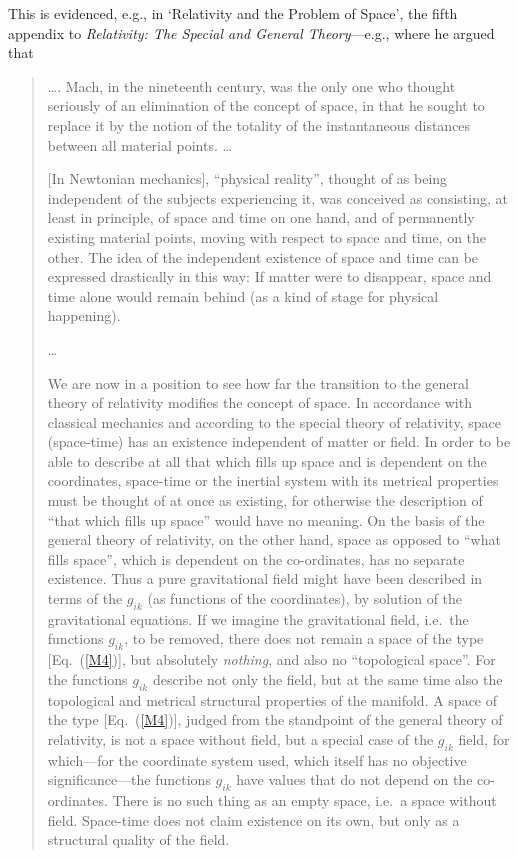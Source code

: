 This is evidenced, e.g., in `Relativity and the Problem of Space', the fifth appendix to \textit{Relativity: The Special and General Theory}---e.g., where he argued that \cite{Einstein2001}
\begin{quotation}
\ldots. Mach, in the nineteenth century, was the only one who thought seriously of an elimination of the concept of space, in that he sought to replace it by the notion of the totality of the instantaneous distances between all material points. \ldots

[In Newtonian mechanics], ``physical reality'', thought of as being independent of the subjects experiencing it, was conceived as consisting, at least in principle, of space and time on one hand, and of permanently existing material points, moving with respect to space and time, on the other. The idea of the independent existence of space and time can be expressed drastically in this way: If matter were to disappear, space and time alone would remain behind (as a kind of stage for physical happening).

\ldots 

We are now in a position to see how far the transition to the general theory of relativity modifies the concept of space. In accordance with classical mechanics and according to the special theory of relativity, space (space-time) has an existence independent of matter or field. In order to be able to describe at all that which fills up space and is dependent on the coordinates, space-time or the inertial system with its metrical properties must be thought of at once as existing, for otherwise the description of ``that which fills up space'' would have no meaning. On the basis of the general theory of relativity, on the other hand, space as opposed to ``what fills space'', which is dependent on the co-ordinates, has no separate existence. Thus a pure gravitational field might have been described in terms of the $g_{ik}$ (as functions of the coordinates), by solution of the gravitational equations. If we imagine the gravitational field, i.e.~the functions $g_{ik}$, to be removed, there does not remain a space of the type [Eq.~(\ref{M4})], but absolutely \textit{nothing}, and also no ``topological space''. For the functions $g_{ik}$ describe not only the field, but at the same time also the topological and metrical structural properties of the manifold. A space of the type [Eq.~(\ref{M4})], judged from the standpoint of the general theory of relativity, is not a space without field, but a special case of the $g_{ik}$ field, for which---for the coordinate system used, which itself has no objective significance---the functions $g_{ik}$ have values that do not depend on the co-ordinates. There is no such thing as an empty space, i.e.~a space without field. Space-time does not claim existence on its own, but only as a structural quality of the field.


\end{quotation}
